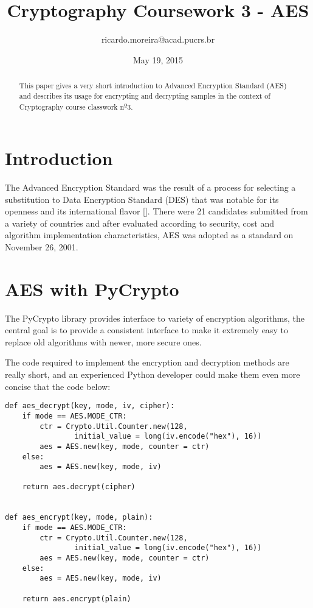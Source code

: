 \documentclass{article}
\title{Cryptography Coursework 3 - AES}
\author{ricardo.moreira@acad.pucrs.br}
\date{May 19, 2015}
\newcommand{\ulo}{\textsuperscript{\b{o}}}
\begin{document}
\maketitle

\begin{abstract}
This paper gives a very short introduction to Advanced Encryption Standard (AES) and describes its usage for encrypting and decrypting samples in the context of Cryptography course classwork n\ulo 3.
\end{abstract}

\section{Introduction}

The Advanced Encryption Standard was the result of a process for selecting a substitution to Data Encryption Standard (DES) that was notable for its openness and its international flavor [\cite{stinson:1995}]. There were 21 candidates submitted from a variety of countries and after evaluated according to security, cost and algorithm implementation characteristics, AES was adopted as a standard on November 26, 2001.

\section{AES with PyCrypto}
The PyCrypto library provides interface to variety of encryption algorithms, the central goal is to provide a consistent interface to make it extremely easy to replace old algorithms with newer, more secure ones.

The code required to implement the encryption and decryption methods are really short, and an experienced Python developer could make them even more concise that the code below:

\begin{verbatim}
def aes_decrypt(key, mode, iv, cipher):
    if mode == AES.MODE_CTR:
        ctr = Crypto.Util.Counter.new(128,
                initial_value = long(iv.encode("hex"), 16))
        aes = AES.new(key, mode, counter = ctr)
    else:
        aes = AES.new(key, mode, iv)

    return aes.decrypt(cipher)


def aes_encrypt(key, mode, plain):
    if mode == AES.MODE_CTR:
        ctr = Crypto.Util.Counter.new(128,
                initial_value = long(iv.encode("hex"), 16))
        aes = AES.new(key, mode, counter = ctr)
    else:
        aes = AES.new(key, mode, iv)

    return aes.encrypt(plain)
\end{verbatim}
\end{document}
